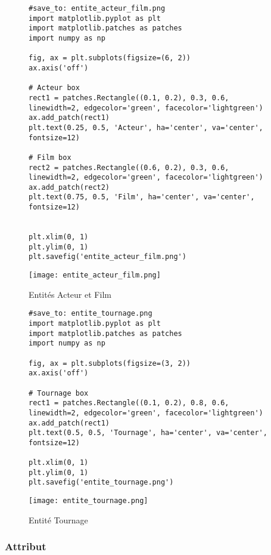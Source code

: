 \documentclass{article}
\begin{document}
\begin{figure}[H]
    \centering
    \begin{minipage}{0.4\textwidth}
        \begin{verbatim}
#save_to: entite_acteur_film.png
import matplotlib.pyplot as plt
import matplotlib.patches as patches
import numpy as np

fig, ax = plt.subplots(figsize=(6, 2))
ax.axis('off')

# Acteur box
rect1 = patches.Rectangle((0.1, 0.2), 0.3, 0.6, linewidth=2, edgecolor='green', facecolor='lightgreen')
ax.add_patch(rect1)
plt.text(0.25, 0.5, 'Acteur', ha='center', va='center', fontsize=12)

# Film box
rect2 = patches.Rectangle((0.6, 0.2), 0.3, 0.6, linewidth=2, edgecolor='green', facecolor='lightgreen')
ax.add_patch(rect2)
plt.text(0.75, 0.5, 'Film', ha='center', va='center', fontsize=12)


plt.xlim(0, 1)
plt.ylim(0, 1)
plt.savefig('entite_acteur_film.png')

        \end{verbatim}
        \texttt{[image: entite\_acteur\_film.png]}
        \caption{Entités Acteur et Film}
        \label{fig:entite_acteur_film}
    \end{minipage}
    \hfill
    \begin{minipage}{0.4\textwidth}
        \begin{verbatim}
#save_to: entite_tournage.png
import matplotlib.pyplot as plt
import matplotlib.patches as patches
import numpy as np

fig, ax = plt.subplots(figsize=(3, 2))
ax.axis('off')

# Tournage box
rect1 = patches.Rectangle((0.1, 0.2), 0.8, 0.6, linewidth=2, edgecolor='green', facecolor='lightgreen')
ax.add_patch(rect1)
plt.text(0.5, 0.5, 'Tournage', ha='center', va='center', fontsize=12)

plt.xlim(0, 1)
plt.ylim(0, 1)
plt.savefig('entite_tournage.png')

        \end{verbatim}
        \texttt{[image: entite\_tournage.png]}
        \caption{Entité Tournage}
        \label{fig:entite_tournage}
    \end{minipage}
\end{figure}


\subsubsection{Attribut}
\end{document}
